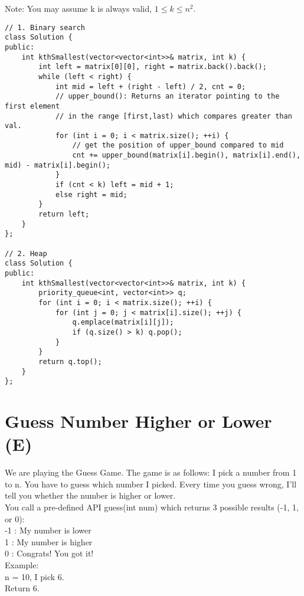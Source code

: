 Note:
You may assume k is always valid, $1 \leq k \leq n^2$.\\

\begin{lstlisting}
// 1. Binary search
class Solution {
public:
    int kthSmallest(vector<vector<int>>& matrix, int k) {
        int left = matrix[0][0], right = matrix.back().back();
        while (left < right) {
            int mid = left + (right - left) / 2, cnt = 0;
            // upper_bound(): Returns an iterator pointing to the first element 
            // in the range [first,last) which compares greater than val.
            for (int i = 0; i < matrix.size(); ++i) {
                // get the position of upper_bound compared to mid
                cnt += upper_bound(matrix[i].begin(), matrix[i].end(), mid) - matrix[i].begin();
            }
            if (cnt < k) left = mid + 1;
            else right = mid;
        }
        return left;
    }
};

// 2. Heap
class Solution {
public:
    int kthSmallest(vector<vector<int>>& matrix, int k) {
        priority_queue<int, vector<int>> q;
        for (int i = 0; i < matrix.size(); ++i) {
            for (int j = 0; j < matrix[i].size(); ++j) {
                q.emplace(matrix[i][j]);
                if (q.size() > k) q.pop();
            }
        }
        return q.top();
    }
};
\end{lstlisting}


\section{Guess Number Higher or Lower (E)}
We are playing the Guess Game. The game is as follows: I pick a number from 1 to n. You have to guess which number I picked. Every time you guess wrong, I'll tell you whether the number is higher or lower.\\

You call a pre-defined API guess(int num) which returns 3 possible results (-1, 1, or 0):\\
-1 : My number is lower\\ 
 1 : My number is higher\\
 0 : Congrats! You got it!\\

Example:\\
n = 10, I pick 6.\\
Return 6.\\

